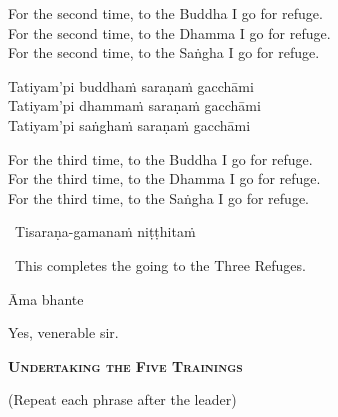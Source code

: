 \begin{english-verses}
  For the second time, to the Buddha I go for refuge.\\
  For the second time, to the Dhamma I go for refuge.\\
  For the second time, to the Saṅgha I go for refuge.
\end{english-verses}

\ifninebythirteen\clearpage\fi

Tatiyam'pi buddhaṁ saraṇaṁ gacchāmi\\
Tatiyam'pi dhammaṁ saraṇaṁ gacchāmi\\
Tatiyam'pi saṅghaṁ saraṇaṁ gacchāmi

\begin{english-verses}
  For the third time, to the Buddha I go for refuge.\\
  For the third time, to the Dhamma I go for refuge.\\
  For the third time, to the Saṅgha I go for refuge.
\end{english-verses}

\ifafive\clearpage\fi
\ifbfive\clearpage\fi

\ifninebythirteen \smallskip \else \fi

\begin{leader}
  \anglebracketleft\ \hspace{-0.5mm}Tisaraṇa-gamanaṁ niṭṭhitaṁ \hspace{-0.5mm}\anglebracketright\
\end{leader}
\begin{leader-english-below-pali}
  \anglebracketleft\ \hspace{-0.5mm}This completes the going to the Three Refuges. \hspace{-0.5mm}\anglebracketright\
\end{leader-english-below-pali}

Āma bhante

\begin{english}
  Yes, venerable sir.
\end{english}

\clearpage



\begin{center}
  \textbf{\textsc{Undertaking the Five Trainings}}
\end{center}

\begin{center}
  (Repeat each phrase after the leader)
\end{center}

